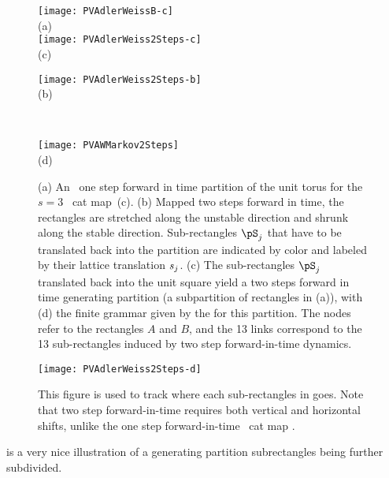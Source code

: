 {%
	\begin{figure}\begin{center}
            \begin{minipage}[c]{0.36\textwidth}\begin{center}
\texttt{[image: PVAdlerWeissB-c]}\\(a) %
\\
\texttt{[image: PVAdlerWeiss2Steps-c]}\\(c)
            \end{center}\end{minipage}
            \begin{minipage}[c]{0.3\textwidth}\begin{center}
\texttt{[image: PVAdlerWeiss2Steps-b]}\\(b)
            \end{center}\end{minipage}
            ~~~
            \begin{minipage}[c]{0.25\textwidth}\begin{center}
\texttt{[image: PVAWMarkov2Steps]}\\(d)
            \end{center}\end{minipage}
\end{center}
  \caption{\label{fig:PVAdlerWeiss2Steps}
(a)
An \AW\ one step forward in time partition of the unit torus for the
$s=3$ \PV\ cat map \,(c).
(b)
Mapped two steps forward in time, the rectangles are stretched along the
unstable direction and shrunk along the stable direction. Sub-rectangles
$\pS_j$ that have to be translated back into the partition are indicated by
color and labeled by their lattice translation
${s_{j}}$.
(c)
The sub-rectangles $\pS_j$ translated back into the unit square yield a
two steps forward in time
generating partition (a subpartition of rectangles in (a)), with
(d)
the finite grammar given by the {\markGraph} for this partition. The nodes
refer to the rectangles $A$ and $B$, and the 13 links correspond to the 13
sub-rectangles induced by two step forward-in-time dynamics.
}
\end{figure}

\begin{figure}
  \centering
\texttt{[image: PVAdlerWeiss2Steps-d]}
  \caption{\label{fig:PVAdlerWeiss2StepsD}
This figure is used to track where each sub-rectangles in
 goes. Note that two step forward-in-time
requires both vertical and horizontal shifts, unlike the one step
forward-in-time \PV\ cat map .
}
\end{figure}

 is a very nice illustration
of a generating partition subrectangles being further subdivided.
} %
